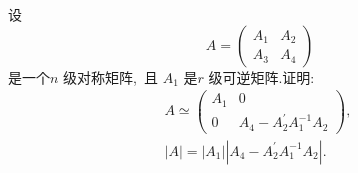 \newpage
\begin{problem}
	设
	$$A=\left(\begin{array}{ll}
		A_{1} & A_{2} \\
		A_{3} & A_{4}
	\end{array}\right)$$
	是一个$  n $ 级对称矩阵,\  且 $ A_{1} $ 是$  r $ 级可逆矩阵.证明:
	$$\begin{array}{l}
		A \simeq\left(\begin{array}{cc}
			A_{1} & 0 \\
			0 & A_{4}-A_{2}^{\prime} A_{1}^{-1} A_{2}
		\end{array}\right),\  \\
		|A|=\left|A_{1}\right|\left|A_{4}-A_{2}^{\prime} A_{1}^{-1} A_{2}\right| \text {. } \\
	\end{array}$$
\end{problem}
